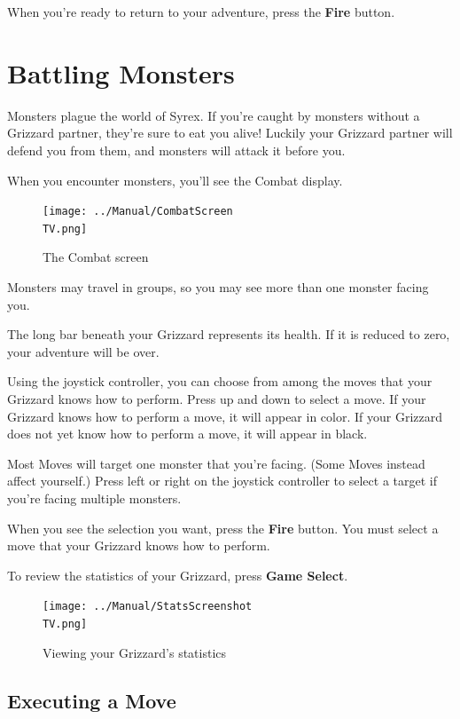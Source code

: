 \documentclass[10pt,twocolumn,openany,article]{memoir}
\newcommand\TV{NTSC}
\newcommand\TV{PAL}
\newcommand\TV{SECAM}
\begin{document}
When you're ready to return to your adventure, press the \textbf{Fire} button.


\section{Battling Monsters}

Monsters plague the world of Syrex. If you're caught by monsters without
a Grizzard partner, they're sure to eat you alive! Luckily your Grizzard
partner  will  defend  you  from  them,  and  monsters  will  attack  it
before you.

When you encounter monsters, you'll  see the Combat display.

\begin{figure}[b]
  \texttt{[image: ../Manual/CombatScreen\\TV.png]}
  \caption{The Combat screen}
\end{figure}

Monsters may  travel in  groups, so  you may see  more than  one monster
facing you.

The  long bar  beneath your  Grizzard represents  its health.  If it  is
reduced to zero, your adventure will be over.

Using the joystick controller, you can  choose from among the moves that
your Grizzard knows how to perform. Press  up and down to select a move.
If your Grizzard knows  how to perform a move, it  will appear in color.
If your Grizzard does not yet know how to perform a move, it will appear
in black.

Most  Moves will  target one  monster  that you're  facing. (Some  Moves
instead affect yourself.) Press left or right on the joystick controller
to select a target if you're facing multiple monsters.

When you  see the selection  you want, press  the \textbf{Fire} button.  You must
select a move that your Grizzard knows how to perform.

To review the statistics of your Grizzard, press \textbf{Game Select}.

\begin{figure}[t]
  \texttt{[image: ../Manual/StatsScreenshot\\TV.png]}
  \caption{Viewing your Grizzard's statistics}
\end{figure}

\subsection{Executing a Move}
\end{document}
